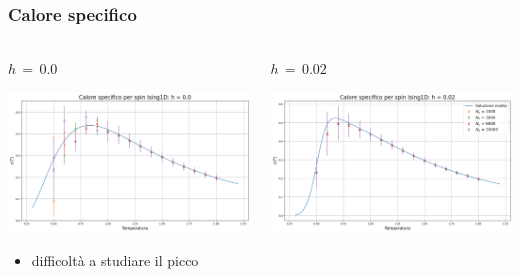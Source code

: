 \begin{frame}
    \frametitle{Calore specifico}
    \framesubtitle{}

    \begin{columns}
        \begin{column}{0.5\textwidth}
            \begin{block}{$h\,=\,0.0$}

            \centering
            \includegraphics[width=\textwidth]{Immagini/simIsing1D/cp_h0.0.png}

            \vspace{0.5cm}
            \begin{itemize}[itemsep=0.5em, label=$\diamond$]
                \item difficoltà a studiare il picco
            \end{itemize}
            
            \end{block}
        \end{column}
    
        \begin{column}{0.5\textwidth}
            \begin{block}{$h\,=\,0.02$}

                \centering
                \includegraphics[width=\textwidth]{Immagini/simIsing1D/cp_h0.02.png}


\end{block}
\end{column}
\end{columns}
\end{frame}
